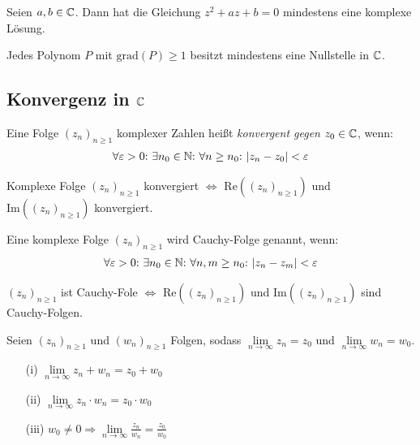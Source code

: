 \begin{framedthm}
	Seien $a,b \in \mathbb{C}$. Dann hat die Gleichung $z^2 + az + b = 0$ mindestens eine komplexe Lösung.
\end{framedthm}

\begin{framedthm}
	Jedes Polynom $P$ mit $\textrm{grad}(P) \geq 1$ besitzt mindestens eine Nullstelle in $\mathbb{C}$.
\end{framedthm}

\subsection{Konvergenz in $\mathbb{C}$}

\begin{frameddefn}
	Eine Folge $(z_n)_{n\geq 1}$ komplexer Zahlen heißt \textit{konvergent gegen} $z_0 \in \mathbb{C}$, wenn:
	\begin{align*}
		\forall \varepsilon > 0{:}\  \exists n_0 \in \mathbb{N}{:}\  \forall n \geq n_0{:}\  |z_n - z_0| < \varepsilon
	\end{align*}
\end{frameddefn}


\begin{framedthm}
	Komplexe Folge $(z_n)_{n\geq 1}$ konvergiert $\iff$ $\textrm{Re}((z_n)_{n\geq 1})$ und $\textrm{Im}((z_n)_{n\geq 1})$ konvergiert.
\end{framedthm}

\begin{frameddefn}
	Eine komplexe Folge $(z_n)_{n\geq 1}$ wird Cauchy-Folge genannt, wenn:
	\begin{align*}
		\forall \varepsilon > 0{:}\  \exists n_0 \in \mathbb{N}{:}\  \forall n,m \geq n_0{:}\  |z_n - z_m| < \varepsilon
	\end{align*}
\end{frameddefn}

\begin{framedthm}
	$(z_n)_{n\geq 1}$ ist Cauchy-Fole $\iff$ $\textrm{Re}((z_n)_{n\geq 1})$ und $\textrm{Im}((z_n)_{n\geq 1})$ sind Cauchy-Folgen.
\end{framedthm}


\begin{framedthm}
	Seien $(z_n)_{n\geq 1}$ und $(w_n)_{n\geq 1}$ Folgen, sodass $\lim\limits_{n \to \infty} z_n = z_0$ und $\lim\limits_{n \to \infty} w_n = w_0$.
	\begin{enumerate}
		\item[(i)]  $\lim\limits_{n \to \infty} z_n + w_n = z_0 + w_0$
		\item[(ii)]  $\lim\limits_{n \to \infty} z_n \cdot w_n = z_0 \cdot w_0$
		\item[(iii)] $w_0 \neq 0 \Rightarrow \lim\limits_{n \to \infty} \frac{z_n}{w_n} = \frac{z_0}{w_0}$ 
	\end{enumerate}
	
\end{framedthm}


